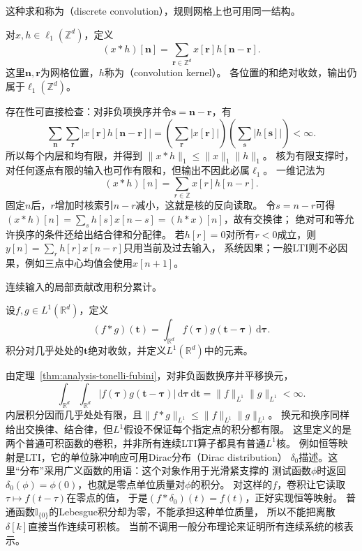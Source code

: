 这种求和称为（discrete convolution），规则网格上也可用同一结构。
\begin{definition}[网格上的离散卷积]
  \label{def:signal-analysis-discrete-convolution}
  对$x,h\in\ell_1(\mathbb Z^d)$，定义
  \begin{equation}
    (x*h)[\bm n]=\sum_{\bm r\in\mathbb Z^d}x[\bm r]h[\bm n-\bm r].
    \label{eq:signal-analysis-discrete-multidimensional-convolution}
  \end{equation}
  这里$\bm n,\bm r$为网格位置，$h$称为（convolution kernel）。
  各位置的和绝对收敛，输出仍属于$\ell_1(\mathbb Z^d)$。
\end{definition}
存在性可直接检查：对非负项换序并令$\bm s=\bm n-\bm r$，有
\[
  \sum_{\bm n}\sum_{\bm r}|x[\bm r]h[\bm n-\bm r]|
  =\left(\sum_{\bm r}|x[\bm r]|\right)
   \left(\sum_{\bm s}|h[\bm s]|\right)<\infty.
\]
所以每个内层和均有限，并得到
$\|x*h\|_1\leq\|x\|_1\|h\|_1$。
核为有限支撑时，对任何逐点有限的输入也可作有限和，但输出不因此必属$\ell_1$。
一维记法为
\begin{equation}
  (x*h)[n]=\sum_{r\in\mathbb Z}x[r]h[n-r].
  \label{eq:signal-analysis-linear-convolution}
\end{equation}
固定$n$后，$r$增加时核索引$n-r$减小，这就是核的反向读取。
令$s=n-r$可得$(x*h)[n]=\sum_s h[s]x[n-s]=(h*x)[n]$，故有交换律；
绝对可和等允许换序的条件还给出结合律和分配律。
若$h[r]=0$对所有$r<0$成立，则$y[n]=\sum_r h[r]x[n-r]$只用当前及过去输入，
系统因果；一般LTI则不必因果，例如三点中心均值会使用$x[n+1]$。

连续输入的局部贡献改用积分累计。
\begin{definition}[连续卷积]
  \label{def:signal-analysis-continuous-convolution}
  设$f,g\in L^1(\mathbb R^d)$，定义
  \begin{equation}
    (f*g)(\bm t)=\int_{\mathbb R^d}f(\bm\tau)g(\bm t-\bm\tau)\,\mathrm d\bm\tau.
    \label{eq:signal-analysis-continuous-convolution}
  \end{equation}
  积分对几乎处处的$\bm t$绝对收敛，并定义$L^1(\mathbb R^d)$中的元素。
\end{definition}
由定理~\ref{thm:analysis-tonelli-fubini}，对非负函数换序并平移换元，
\[
  \int_{\mathbb R^d}\int_{\mathbb R^d}
  |f(\bm\tau)g(\bm t-\bm\tau)|\,\mathrm d\bm\tau\,\mathrm d\bm t
  =\|f\|_{L^1}\|g\|_{L^1}<\infty.
\]
内层积分因而几乎处处有限，且$\|f*g\|_{L^1}\leq\|f\|_{L^1}\|g\|_{L^1}$。
换元和换序同样给出交换律、结合律，但$L^1$假设不保证每个指定点的积分都有限。
这里定义的是两个普通可积函数的卷积，并非所有连续LTI算子都具有普通$L^1$核。
例如恒等映射是LTI，它的单位脉冲响应可用Dirac分布（Dirac distribution）
$\delta_0$描述。这里“分布”采用广义函数的用语：这个对象作用于光滑紧支撑的
测试函数$\phi$时返回$\delta_0(\phi)=\phi(0)$，也就是零点单位质量对$\phi$的积分。
对这样的$f$，卷积让它读取$\tau\mapsto f(t-\tau)$在零点的值，
于是$(f*\delta_0)(t)=f(t)$，正好实现恒等映射。
普通函数$\mathbb I_{\{0\}}$的Lebesgue积分却为零，不能承担这种单位质量，
所以不能把离散$\delta[k]$直接当作连续可积核。
当前不调用一般分布理论来证明所有连续系统的核表示。

